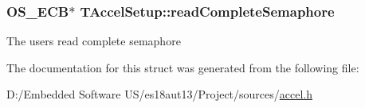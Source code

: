 \subsubsection[{read\+Complete\+Semaphore}]{\setlength{\rightskip}{0pt plus 5cm}O\+S\+\_\+\+E\+C\+B$\ast$ T\+Accel\+Setup\+::read\+Complete\+Semaphore}\label{struct_t_accel_setup_a5f8d20dd0fc4852e451766e44c053aa1}
The user\textquotesingle{}s read complete semaphore 

The documentation for this struct was generated from the following file\+:\begin{DoxyCompactItemize}
\item 
D\+:/\+Embedded Software U\+S/es18aut13/\+Project/sources/\hyperlink{accel_8h}{accel.\+h}\end{DoxyCompactItemize}

